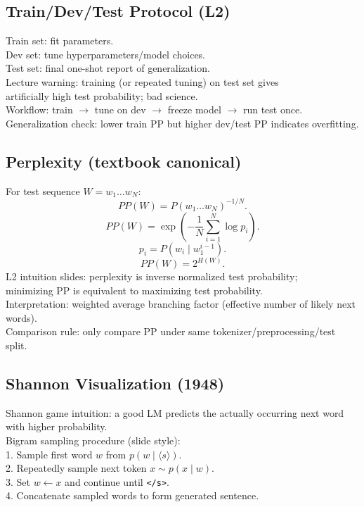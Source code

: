 \subsection*{Train/Dev/Test Protocol (L2)}
Train set: fit parameters.\\
Dev set: tune hyperparameters/model choices.\\
Test set: final one-shot report of generalization.\\
Lecture warning: training (or repeated tuning) on test set gives\\
artificially high test probability; bad science.\\
Workflow: train $\rightarrow$ tune on dev $\rightarrow$ freeze model $\rightarrow$ run test once.\\
Generalization check: lower train PP but higher dev/test PP indicates overfitting.

\subsection*{Perplexity (textbook canonical)}
For test sequence $W=w_1\ldots w_N$:
\[
PP(W)=P(w_1\ldots w_N)^{-1/N}.
\]
\[
PP(W)=\exp\!\left(-\frac{1}{N}\sum_{i=1}^{N}\log p_i\right).
\]
\[
p_i=P(w_i\mid w_1^{i-1}).
\]
\[
PP(W)=2^{H(W)}.
\]
L2 intuition slides: perplexity is inverse normalized test probability;\\
minimizing PP is equivalent to maximizing test probability.\\
Interpretation: weighted average branching factor (effective number of likely next words).\\
Comparison rule: only compare PP under same tokenizer/preprocessing/test split.

\subsection*{Shannon Visualization (1948)}
Shannon game intuition: a good LM predicts the actually occurring next word with higher probability.\\
Bigram sampling procedure (slide style):\\
1. Sample first word $w$ from $p(w\mid\langle s\rangle)$.\\
2. Repeatedly sample next token $x\sim p(x\mid w)$.\\
3. Set $w\leftarrow x$ and continue until \texttt{</s>}.\\
4. Concatenate sampled words to form generated sentence.

